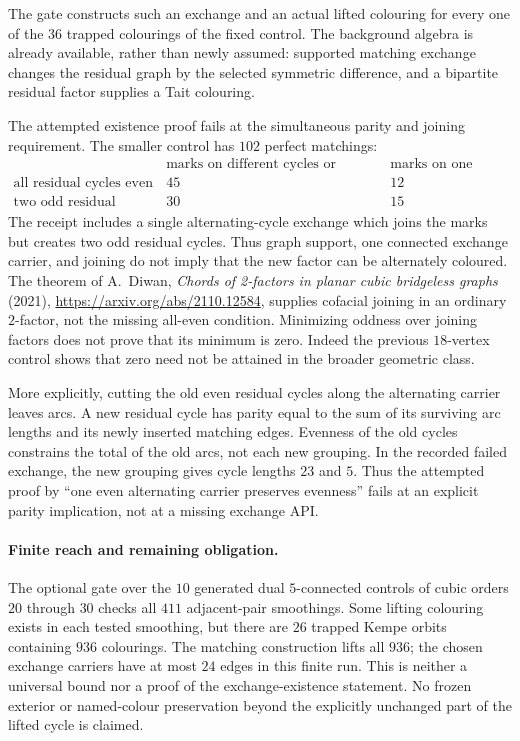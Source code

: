 The gate constructs such an exchange and an actual lifted colouring
for every one of the $36$ trapped colourings of the fixed control.
The background algebra is already available, rather than newly
assumed: supported matching exchange changes the residual graph by
the selected symmetric difference, and a bipartite residual factor
supplies a Tait colouring.

The attempted existence proof fails at the simultaneous parity and
joining requirement. The smaller control has $102$ perfect matchings:
\[
\begin{array}{c|rr}
 & \text{marks on different cycles or absent} & \text{marks on one cycle}\\
 \text{all residual cycles even} & 45 & 12\\
 \text{two odd residual cycles} & 30 & 15
\end{array}
\]
The receipt includes a single alternating-cycle exchange which joins
the marks but creates two odd residual cycles. Thus graph support,
one connected exchange carrier, and joining do not imply that the
new factor can be alternately coloured. The theorem of A.~Diwan,
\emph{Chords of 2-factors in planar cubic bridgeless graphs} (2021),
\url{https://arxiv.org/abs/2110.12584}, supplies cofacial joining in an
ordinary $2$-factor, not the missing all-even condition. Minimizing
oddness over joining factors does not prove that its minimum is zero.
Indeed the previous $18$-vertex control shows that zero need not be
attained in the broader geometric class.

More explicitly, cutting the old even residual cycles along the
alternating carrier leaves arcs. A new residual cycle has parity equal
to the sum of its surviving arc lengths and its newly inserted
matching edges. Evenness of the old cycles constrains the total of
the old arcs, not each new grouping. In the recorded failed exchange,
the new grouping gives cycle lengths $23$ and $5$. Thus the attempted
proof by ``one even alternating carrier preserves evenness'' fails
at an explicit parity implication, not at a missing exchange API.

\paragraph{Finite reach and remaining obligation.}
The optional gate over the $10$ generated dual $5$-connected controls
of cubic orders $20$ through $30$ checks all $411$ adjacent-pair
smoothings. Some lifting colouring exists in each tested smoothing,
but there are $26$ trapped Kempe orbits containing $936$ colourings.
The matching construction lifts all $936$; the chosen exchange
carriers have at most $24$ edges in this finite run. This is neither a
universal bound nor a proof of the exchange-existence statement.
No frozen exterior or named-colour preservation beyond the explicitly
unchanged part of the lifted cycle is claimed.

